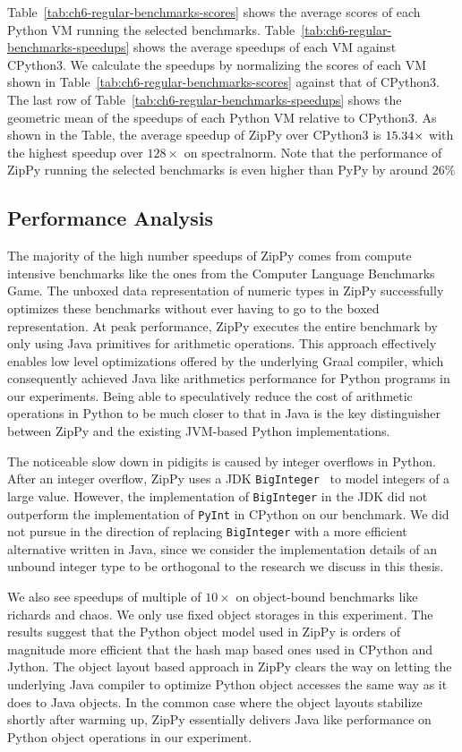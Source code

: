 Table~\ref{tab:ch6-regular-benchmarks-scores} shows the average scores of each Python VM running the selected benchmarks.
Table~\ref{tab:ch6-regular-benchmarks-speedups} shows the average speedups of each VM against CPython3.
We calculate the speedups by normalizing the scores of each VM shown in Table~\ref{tab:ch6-regular-benchmarks-scores} against that of CPython3.
The last row of Table~\ref{tab:ch6-regular-benchmarks-speedups} shows the geometric mean of the speedups of each Python VM relative to CPython3.
As shown in the Table, the average speedup of ZipPy over CPython3 is $15.34{}\times$ with the highest speedup over $128\times$ on \textsf{spectralnorm}.
Note that the performance of ZipPy running the selected benchmarks is even higher than PyPy by around $26\%$

\subsection{Performance Analysis}

The majority of the high number speedups of ZipPy comes from compute intensive benchmarks like the ones from the Computer Language Benchmarks Game.
The unboxed data representation of numeric types in ZipPy successfully optimizes these benchmarks without ever having to go to the boxed representation.
At peak performance, ZipPy executes the entire benchmark by only using Java primitives for arithmetic operations.
This approach effectively enables low level optimizations offered by the underlying Graal compiler, which consequently achieved Java like arithmetics performance for Python programs in our experiments.
Being able to speculatively reduce the cost of arithmetic operations in Python to be much closer to that in Java is the key distinguisher between ZipPy and the existing JVM-based Python implementations.

The noticeable slow down in \textsf{pidigits} is caused by integer overflows in Python.
After an integer overflow, ZipPy uses a JDK \texttt{BigInteger}~\cite{hotspot} to model integers of a large value.
However, the implementation of \texttt{BigInteger} in the JDK did not outperform the implementation of \texttt{PyInt} in CPython on our benchmark.
We did not pursue in the direction of replacing \texttt{BigInteger} with a more efficient alternative written in Java, since we consider the implementation details of an unbound integer type to be orthogonal to the research we discuss in this thesis.

We also see speedups of multiple of $10\times$ on object-bound benchmarks like \textsf{richards} and \textsf{chaos}.
We only use fixed object storages in this experiment.
The results suggest that the Python object model used in ZipPy is orders of magnitude more efficient that the hash map based ones used in CPython and Jython.
The object layout based approach in ZipPy clears the way on letting the underlying Java compiler to optimize Python object accesses the same way as it does to Java objects.
In the common case where the object layouts stabilize shortly after warming up, ZipPy essentially delivers Java like performance on Python object operations in our experiment.

